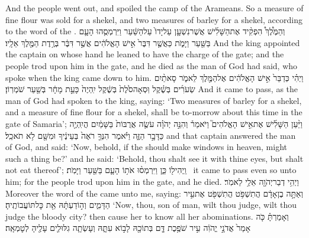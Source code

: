 {And the people went out, and spoiled the camp of the Arameans. So a measure of fine flour was sold for a shekel, and two measures of barley for a shekel, according to the word of the \lord.}
{וְהַמֶּ֩לֶךְ֩ הִפְקִ֨יד אֶת\maqqaf הַשָּׁלִ֜ישׁ אֲשֶׁר\maqqaf נִשְׁעָ֤ן עַל\maqqaf יָדוֹ֙ עַל\maqqaf הַשַּׁ֔עַר וַיִּרְמְסֻ֧הוּ הָעָ֛ם בַּשַּׁ֖עַר וַיָּמֹ֑ת כַּאֲשֶׁ֤ר דִּבֶּר֙ אִ֣ישׁ הָאֱלֹהִ֔ים אֲשֶׁ֣ר דִּבֶּ֔ר בְּרֶ֥דֶת הַמֶּ֖לֶךְ אֵלָֽיו׃}
{And the king appointed the captain on whose hand he leaned to have the charge of the gate; and the people trod upon him in the gate, and he died as the man of God had said, who spoke when the king came down to him.}
{וַיְהִ֗י כְּדַבֵּר֙ אִ֣ישׁ הָאֱלֹהִ֔ים אֶל\maqqaf הַמֶּ֖לֶךְ לֵאמֹ֑ר סָאתַ֨יִם שְׂעֹרִ֜ים בְּשֶׁ֗קֶל וּֽסְאָה\maqqaf סֹ֙לֶת֙ בְּשֶׁ֔קֶל יִֽהְיֶה֙ כָּעֵ֣ת מָחָ֔ר בְּשַׁ֖עַר שֹׁמְרֽוֹן׃}
{And it came to pass, as the man of God had spoken to the king, saying: ‘Two measures of barley for a shekel, and a measure of fine flour for a shekel, shall be to-morrow about this time in the gate of Samaria’;}
{וַיַּ֨עַן הַשָּׁלִ֜ישׁ אֶת\maqqaf אִ֣ישׁ הָאֱלֹהִים֮ וַיֹּאמַר֒ וְהִנֵּ֣ה יְהֹוָ֗ה עֹשֶׂ֤ה אֲרֻבּוֹת֙ בַּשָּׁמַ֔יִם הֲיִֽהְיֶ֖ה כַּדָּבָ֣ר הַזֶּ֑ה וַיֹּ֗אמֶר הִנְּךָ֤ רֹאֶה֙ בְּעֵינֶ֔יךָ וּמִשָּׁ֖ם לֹ֥א תֹאכֵֽל׃}
{and that captain answered the man of God, and said: ‘Now, behold, if the \lord\space should make windows in heaven, might such a thing be?’ and he said: ‘Behold, thou shalt see it with thine eyes, but shalt not eat thereof’;}
{וַֽיְהִי\maqqaf ל֖וֹ כֵּ֑ן וַיִּרְמְס֨וּ אֹת֥וֹ הָעָ֛ם בַּשַּׁ֖עַר וַיָּמֹֽת׃ \setuma }
{it came to pass even so unto him; for the people trod upon him in the gate, and he died.}
\label{haft_29}
\setcounter{chap}{22}
\setcounter{verse}{1}
{וַיְהִ֥י דְבַר\maqqaf יְהֹוָ֖ה אֵלַ֥י לֵאמֹֽר׃}
{Moreover the word of the \lord\space came unto me, saying:}
{וְאַתָּ֣ה בֶן\maqqaf אָדָ֔ם הֲתִשְׁפֹּ֥ט הֲתִשְׁפֹּ֖ט אֶת\maqqaf עִ֣יר הַדָּמִ֑ים וְה֣וֹדַעְתָּ֔הּ אֵ֖ת כׇּל\maqqaf תּוֹעֲבוֹתֶֽיהָ׃}
{‘Now, thou, son of man, wilt thou judge, wilt thou judge the bloody city? then cause her to know all her abominations.}
{וְאָמַרְתָּ֗ כֹּ֤ה אָמַר֙ אֲדֹנָ֣י יֱהֹוִ֔ה עִ֣יר שֹׁפֶ֥כֶת דָּ֛ם בְּתוֹכָ֖הּ לָב֣וֹא עִתָּ֑הּ וְעָשְׂתָ֧ה גִלּוּלִ֛ים עָלֶ֖יהָ לְטׇמְאָֽה׃}

